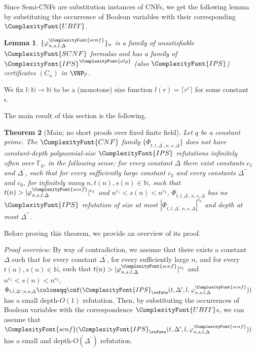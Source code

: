 \documentclass[11pt,letter]{article}
\newtheorem{theorem}{Theorem}[section]
\newtheorem{lemma}[theorem]{Lemma}
\theoremstyle{remark} %
\newcommand{\alg}{\ComplexityFont{alg}}
\newcommand{\IPS}{%
    {
        \ComplexityFont{IPS} 
    }
}
\newcommand{\CNF}{ %
    {
        \ComplexityFont{CNF}
    }
}
\newcommand{\SCNF}{%
    {
        \ComplexityFont{SCNF}
    }
}
\newcommand{\UBIT}{%
    {
        \ComplexityFont{UBIT}
    }
}
\newcommand{\scnf}{
    {
        \ComplexityFont{scnf}
    }
}
\begin{document}
{    Since Semi-CNFs are substitution instances of CNFs, we get the following lemma by substituting the occurrence of Boolean variables with their corresponding $\UBIT$.
    \begin{lemma}
        \label{lemma: unsat SCNF formula has VNP refutation}
        $\{\varphi_{n,s,l,\Delta}^\scnf\}_n$ is a family of unsatisfiable $\SCNF$ formulas and has a family of $\IPS^\alg$ (also $\IPS$) certificates $(C_n)$ in $\VNP_\mathbb{F}$.
    \end{lemma}
    
    
    We fix $l: \mathbb{N} \to \mathbb{N}$ to be a (monotone) size function $l(r) = \lceil r^\epsilon\rceil$ for some constant $\epsilon$.

    The main result of this section is the following.

    \begin{theorem}[Main; no short proofs over fixed finite field]
        \label{theorem: main theorem}
        Let $q$ be a constant prime.
        The $\CNF$ family $\{\Phi_{t,l,\Delta^\prime,n,s,\Delta}\}$ does not have constant-depth polynomial-size $\IPS$ refutations infinitely often over $\mathbb{F}_q$, in the following sense: 
        for every constant $\Delta$ there exist constants $c_1$ and  $\Delta^\prime$,  such that for every sufficiently large constant $c_2$ and every constants $\Delta^{\prime\prime}$ and $c_0$, for infinitely many $n, t(n), s(n) \in \mathbb{N}$, such that $t(n) > |\varphi_{n,s,l,\Delta}^\scnf|^{c_1}$ and $n^{c_1} < s(n) < n^{c_2}$, $\Phi_{t,l,\Delta^\prime,n,s,\Delta}$ has no $\IPS$ refutation of size at most $|\Phi_{t,l,\Delta^\prime,n,s,\Delta}|^{c_0}$ and depth at most $\Delta^{\prime\prime}$.
    \end{theorem}

    Before proving this theorem, we provide an overview of its proof. 

\medskip 
    
    
    \noindent\textit{Proof overview:} 
    By way of contradiction, we assume that there exists a constant $\Delta$ such that for every constant $\Delta^\prime$, for every sufficiently large $n$, and for every $t(n), s(n) \in \mathbb{N}$, such that $t(n) > |\varphi_{n,s,l,\Delta}^\scnf|^{c_1}$ and $n^{c_1} < s(n) < n^{c_2}$,
        $\Phi_{t,l,\Delta^\prime,n,s,\Delta} \coloneqq \cnf(\IPS_\refute(t,\Delta^\prime,l,\varphi_{n,s,l,\Delta}^\scnf))$ has a small depth-$O(1)$ refutation. Then, by substituting the occurrences of Boolean variables with the correspondence $\UBIT$s, we can assume that $\scnf(\IPS_\refute(t,\Delta^\prime,l,\varphi_{n,s,l,\Delta}^\scnf))$ has a small and depth-$O(\Delta^\prime)$ refutation.

}
\end{document}
